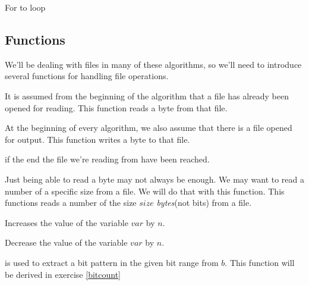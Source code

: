 \begin{algorithm}
  \caption{For to loop}\algohack{}
  \label{alg:forto}
  \begin{algorithmic}[1]
    \EndFor
  \end{algorithmic}
\end{algorithm}

\subsection{Functions}
\label{sec:pseudocode}

We'll be dealing with files in many of these algorithms, so we'll need
to introduce several functions for handling file operations.

\begin{description}[font=\normalfont]
\item[\textproc{ReadByte}] It is assumed from the beginning of the
  algorithm that a file has already been opened for reading. This
  function reads a byte from that file.

\item[\Call{WriteByte}{$\var{byte}$}] At the beginning of every algorithm,
  we also assume that there is a file opened for output. This function
  writes a byte to that file.

\item[\textproc{EndOfFileReached}] \True{} if the end the file we're
  reading from have been reached.

\item[\Call{Read}{$\var{size}$}] Just being able to read a byte may not
  always be enough. We may want to read a number of a specific size
  from a file. We will do that with this function. This functions
  reads a number of the size $size$ \textit{bytes}(not bits) from a
  file.

\item[\Call{Inc}{\ensuremath{\var{var},n}}] Increases the value of the
  variable $var$ by $n$.

\item[\Call{Dec}{\ensuremath{\var{var},n}}] Decrease the value of the
  variable $var$ by $n$.

\item[\Call{getbits}{$b, \var{start}, \var{end}$}] is used to extract a bit
  pattern in the given bit range from $b$. This function will be
  derived in exercise \ref{bitcount}

\end{description}

